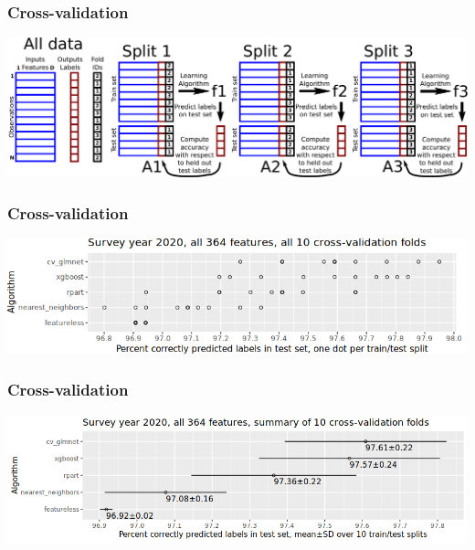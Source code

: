\documentclass{beamer}
\begin{document}
\begin{frame}
  \frametitle{Cross-validation}
  \includegraphics[width=\textwidth]{drawing-cross-validation.pdf}
\end{frame}

\begin{frame}
  \frametitle{Cross-validation}
  \includegraphics[width=\textwidth]{download-nsch-mlr3batchmark-registry-one-set-all-features.png}
\end{frame}

\begin{frame}
  \frametitle{Cross-validation}
  \includegraphics[width=\textwidth]{download-nsch-mlr3batchmark-registry-one-set-all-features-stats.png}
\end{frame}
\end{document}
